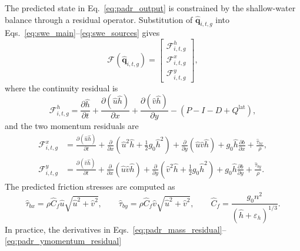\documentclass[pdflatex,sn-mathphys-ay]{sn-jnl}
\theoremstyle{thmstyleone}
\theoremstyle{thmstylethree}
\theoremstyle{thmstyletwo}
\begin{document}
The predicted state in Eq.~\eqref{eq:padr_output} is constrained by
the shallow-water balance through a residual operator.  Substitution of
$\hat{\mathbf{q}}_{i,t,g}$ into
Eqs.~\eqref{eq:swe_main}--\eqref{eq:swe_sources} gives
\begin{equation}
  \mathcal{F}
  \left(
    \hat{\mathbf{q}}_{i,t,g}
  \right)
  =
  \begin{bmatrix}
    \mathcal{F}^{h}_{i,t,g} \\
    \mathcal{F}^{x}_{i,t,g} \\
    \mathcal{F}^{y}_{i,t,g}
  \end{bmatrix},
  \label{eq:padr_residual_vector}
\end{equation}
where the continuity residual is
\begin{equation}
  \mathcal{F}^{h}_{i,t,g}
  =
  \frac{\partial \hat{h}}{\partial t}
  +
  \frac{\partial (\hat{u}\hat{h})}{\partial x}
  +
  \frac{\partial (\hat{v}\hat{h})}{\partial y}
  -
  \left(
    P-I-D+Q^{\mathrm{lat}}
  \right),
  \label{eq:padr_mass_residual}
\end{equation}
and the two momentum residuals are
\begin{align}
  \mathcal{F}^{x}_{i,t,g}
  &=
  \frac{\partial (\hat{u}\hat{h})}{\partial t}
  +
  \frac{\partial}{\partial x}
  \left(
    \hat{u}^{2}\hat{h}
    +
    \frac{1}{2}g_{0}\hat{h}^{2}
  \right)
  +
  \frac{\partial}{\partial y}
  \left(
    \hat{u}\hat{v}\hat{h}
  \right)
  +
  g_{0}\hat{h}
  \frac{\partial b}{\partial x}
  +
  \frac{\hat{\tau}_{bx}}{\rho},
  \label{eq:padr_xmomentum_residual}
  \\
  \mathcal{F}^{y}_{i,t,g}
  &=
  \frac{\partial (\hat{v}\hat{h})}{\partial t}
  +
  \frac{\partial}{\partial x}
  \left(
    \hat{u}\hat{v}\hat{h}
  \right)
  +
  \frac{\partial}{\partial y}
  \left(
    \hat{v}^{2}\hat{h}
    +
    \frac{1}{2}g_{0}\hat{h}^{2}
  \right)
  +
  g_{0}\hat{h}
  \frac{\partial b}{\partial y}
  +
  \frac{\hat{\tau}_{by}}{\rho}.
  \label{eq:padr_ymomentum_residual}
\end{align}
The predicted friction stresses are computed as
\begin{equation}
  \hat{\tau}_{bx}
  =
  \rho \hat{C}_{f}
  \hat{u}
  \sqrt{\hat{u}^{2}+\hat{v}^{2}},
  \qquad
  \hat{\tau}_{by}
  =
  \rho \hat{C}_{f}
  \hat{v}
  \sqrt{\hat{u}^{2}+\hat{v}^{2}},
  \qquad
  \hat{C}_{f}
  =
  \frac{g_{0}n^{2}}
  {(\hat{h}+\varepsilon_h)^{1/3}}.
  \label{eq:padr_friction}
\end{equation}
In practice, the derivatives in
Eqs.~\eqref{eq:padr_mass_residual}--\eqref{eq:padr_ymomentum_residual}
\end{document}
